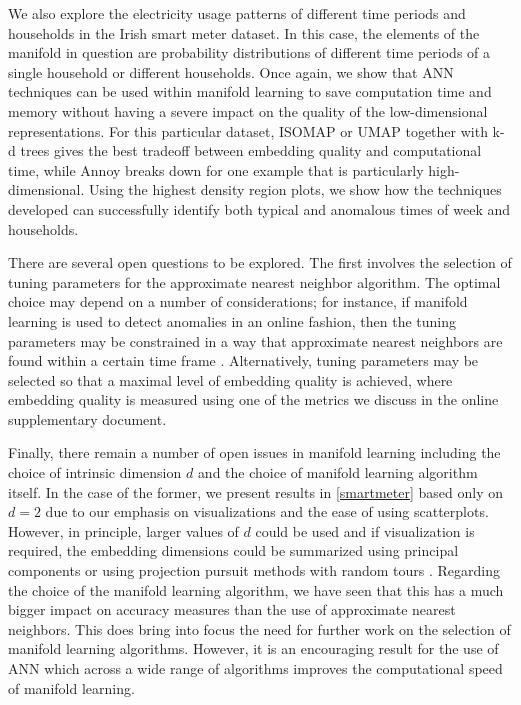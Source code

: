 \documentclass{article}
\begin{document}
We also explore the electricity usage patterns of different time periods
and households in the Irish smart meter dataset. In this case, the
elements of the manifold in question are probability distributions of
different time periods of a single household or different households.
Once again, we show that ANN techniques can be used within manifold
learning to save computation time and memory without having a severe
impact on the quality of the low-dimensional representations. For this
particular dataset, ISOMAP or UMAP together with k-d trees gives the
best tradeoff between embedding quality and computational time, while
Annoy breaks down for one example that is particularly high-dimensional.
Using the highest density region plots, we show how the techniques
developed can successfully identify both typical and anomalous times of
week and households.

There are several open questions to be explored. The first involves the
selection of tuning parameters for the approximate nearest neighbor
algorithm. The optimal choice may depend on a number of considerations;
for instance, if manifold learning is used to detect anomalies in an
online fashion, then the tuning parameters may be constrained in a way
that approximate nearest neighbors are found within a certain time frame
\citep{Talagala2020-ck}. Alternatively, tuning parameters may be
selected so that a maximal level of embedding quality is achieved, where
embedding quality is measured using one of the metrics we discuss in the
online supplementary document.

Finally, there remain a number of open issues in manifold learning
including the choice of intrinsic dimension \(d\) \citep{Denti2021-jl}
and the choice of manifold learning algorithm itself. In the case of the
former, we present results in \autoref{smartmeter} based only on \(d=2\)
due to our emphasis on visualizations and the ease of using
scatterplots. However, in principle, larger values of \(d\) could be
used and if visualization is required, the embedding dimensions could be
summarized using principal components or using projection pursuit
methods with random tours \citep{Cook1995-jx, Laa2020-qx}. Regarding the
choice of the manifold learning algorithm, we have seen that this has a
much bigger impact on accuracy measures than the use of approximate
nearest neighbors. This does bring into focus the need for further work
on the selection of manifold learning algorithms. However, it is an
encouraging result for the use of ANN which across a wide range of
algorithms improves the computational speed of manifold learning.
\end{document}
